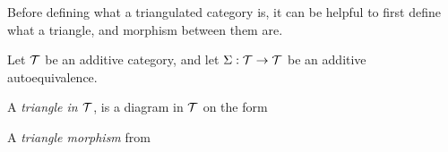 Before defining what a triangulated category is, it can be helpful to first define what a triangle, and morphism between them are.

\begin{definition}[Triangles]
    \label{def:triangles}
    Let \( {\mathcal{T}} \) be an additive category, and let \( \Sigma: {\mathcal{T}} \to {\mathcal{T}} \) be an additive autoequivalence.

    A \emph{triangle in \( {\mathcal{T}} \)}, is a diagram in \( {\mathcal{T}} \) on the form
    \begin{center}
    \end{center}

    A \emph{triangle morphism} from
    \begin{center}


\end{center}
\end{definition}
